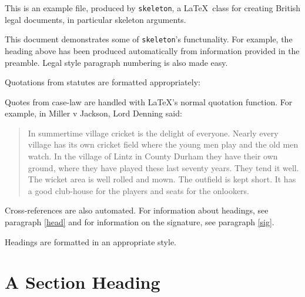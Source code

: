 \documentclass[10pt, oneside]{skeleton}
\date{\today}
\begin{document}
	
	\legalhead
			
	\pa This is an example file, produced by \texttt{skeleton}, a \LaTeX\ class for creating British legal documents, in particular skeleton arguments.
	
	\pa This document demonstrates some of \texttt{skeleton}'s functunality. For example, the heading above has been produced automatically from information provided in the preamble. Legal style paragraph numbering is also made easy.\label{head}

	\pa Quotations from statutes are formatted appropriately:
	
	\begin{statquote}
		\begin{instatquote}
			\end{instatquote}
	\end{statquote}
	
	\pa Quotes from case-law are handled with \LaTeX's normal quotation function. For example, in Miller v Jackson, Lord Denning said:
	
	\begin{quotation}
		In summertime village cricket is the delight of everyone. Nearly every village has its own cricket field where the young men play and the old men watch. In the village of Lintz in County Durham they have their own ground, where they have played these last seventy years. They tend it well. The wicket area is well rolled and mown. The outfield is kept short. It has a good club-house for the players and seats for the onlookers.
	\end{quotation} 

	\pa Cross-references are also automated. For information about headings, see paragraph \ref{head} and for information on the signature, see paragraph \ref{sig}.
	
	\pa Headings are formatted in an appropriate style.
	
	\section{A Section Heading} %
	\label{sec:a_section_heading}
	
\end{document}
